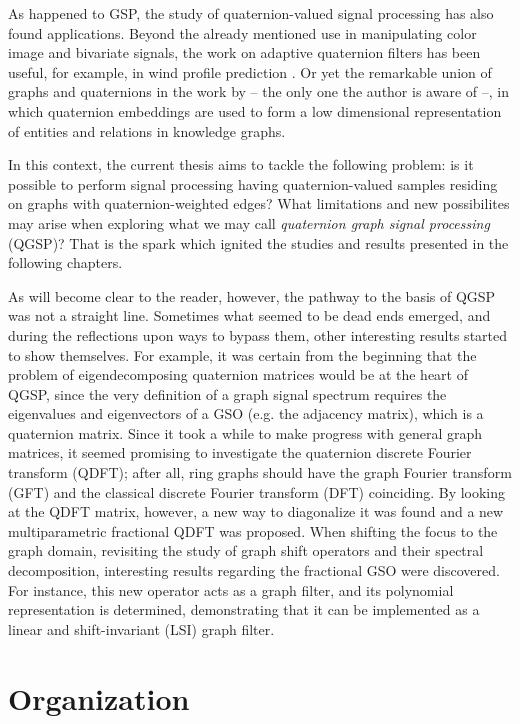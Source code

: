 As happened to GSP, the study of quaternion-valued signal processing has also found applications. Beyond the already mentioned use in manipulating color image and bivariate signals, the work on adaptive quaternion filters has been useful, for example, in wind profile prediction \cite{jiang2014general}. Or yet the remarkable union of graphs and quaternions in the work by \cite{zhang2019quaternion} -- the only one the author is aware of --, in which quaternion embeddings are used to form a low dimensional representation of entities and relations in knowledge graphs.

In this context, the current thesis aims to tackle the following problem: is it possible to perform signal processing having quaternion-valued samples residing on graphs with quaternion-weighted edges? What limitations and new possibilites may arise when exploring what we may call \textit{quaternion graph signal processing} (QGSP)? That is the spark which ignited the studies and results presented in the following chapters.

As will become clear to the reader, however, the pathway to the basis of QGSP was not a straight line. Sometimes what seemed to be dead ends emerged, and during the reflections upon ways to bypass them, other interesting results started to show themselves. For example, it was certain from the beginning that the problem of eigendecomposing quaternion matrices would be at the heart of QGSP, since the very definition of a graph signal spectrum requires the eigenvalues and eigenvectors of a GSO (e.g. the adjacency matrix), which is a quaternion matrix. Since it took a while to make progress with general graph matrices, it seemed promising to investigate the quaternion discrete Fourier transform (QDFT); after all, ring graphs should have the graph Fourier transform (GFT) and the classical discrete Fourier transform (DFT) coinciding. By looking at the QDFT matrix, however, a new way to diagonalize it was found and a new multiparametric fractional QDFT was proposed. When shifting the focus to the graph domain, revisiting the study of graph shift operators and their spectral decomposition, interesting results regarding the fractional GSO were discovered. For instance, this new operator acts as a graph filter, and its polynomial representation is determined, demonstrating that it can be implemented as a linear and shift-invariant (LSI) graph filter.

\section{Organization}

